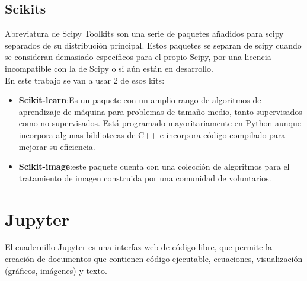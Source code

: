 \documentclass[a4paper,12pt]{report}
\begin{document}
\subsection{Scikits}

Abreviatura de Scipy Toolkits son una serie de paquetes añadidos para scipy separados de su distribución principal. Estos paquetes se separan de scipy cuando se consideran demasiado específicos para el propio Scipy, por una licencia incompatible con la de Scipy o si aún están en desarrollo.\\

En este trabajo se van a usar 2 de esos kits:\\


\begin{itemize}

	\item \textbf{Scikit-learn}:Es un paquete con un amplio rango de algoritmos de aprendizaje de máquina para problemas de tamaño medio, tanto supervisados como no supervisados. Está programado mayoritariamente en Python aunque incorpora algunas bibliotecas de C++ e incorpora código compilado para mejorar su eficiencia.

	\item \textbf{Scikit-image}:este paquete cuenta con una colección de algoritmos para el tratamiento de imagen construida por una comunidad de voluntarios.
\end{itemize}
\section{Jupyter}

El cuadernillo Jupyter es una interfaz web de código libre, que permite la creación de documentos que contienen código ejecutable, ecuaciones, visualización (gráficos, imágenes) y texto.\\
\end{document}
